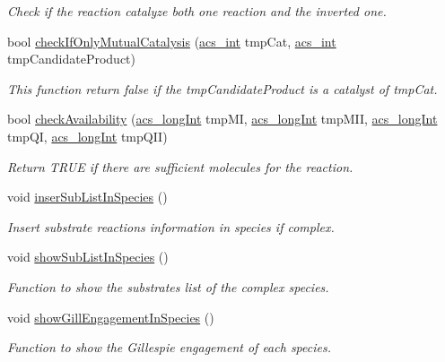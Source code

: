 \begin{DoxyCompactItemize}
\begin{DoxyCompactList}\small\item\em Check if the reaction catalyze both one reaction and the inverted one. \end{DoxyCompactList}\item 
bool \hyperlink{a00011_abdafaeba15b5d32fd35569869c6244d5}{check\-If\-Only\-Mutual\-Catalysis} (\hyperlink{a00024_a8d277355641a098190360234e2ebde35}{acs\-\_\-int} tmp\-Cat, \hyperlink{a00024_a8d277355641a098190360234e2ebde35}{acs\-\_\-int} tmp\-Candidate\-Product)
\begin{DoxyCompactList}\small\item\em This function return false if the tmp\-Candidate\-Product is a catalyst of tmp\-Cat. \end{DoxyCompactList}\item 
bool \hyperlink{a00011_ad3ebcd7ab1c9ba1a0f65b264b97adf33}{check\-Availability} (\hyperlink{a00024_a19319d75f02db4308bc5c0026d98cd85}{acs\-\_\-long\-Int} tmp\-M\-I, \hyperlink{a00024_a19319d75f02db4308bc5c0026d98cd85}{acs\-\_\-long\-Int} tmp\-M\-I\-I, \hyperlink{a00024_a19319d75f02db4308bc5c0026d98cd85}{acs\-\_\-long\-Int} tmp\-Q\-I, \hyperlink{a00024_a19319d75f02db4308bc5c0026d98cd85}{acs\-\_\-long\-Int} tmp\-Q\-I\-I)
\begin{DoxyCompactList}\small\item\em Return T\-R\-U\-E if there are sufficient molecules for the reaction. \end{DoxyCompactList}\item 
void \hyperlink{a00011_af293fafca4582120d88f888d70d8623a}{inser\-Sub\-List\-In\-Species} ()
\begin{DoxyCompactList}\small\item\em Insert substrate reactions information in species if complex. \end{DoxyCompactList}\item 
void \hyperlink{a00011_a5cb194f927ddc7a804a942ca71f062af}{show\-Sub\-List\-In\-Species} ()
\begin{DoxyCompactList}\small\item\em Function to show the substrates list of the complex species. \end{DoxyCompactList}\item 
void \hyperlink{a00011_aef1d3687767151218f3b7379dc230430}{show\-Gill\-Engagement\-In\-Species} ()
\begin{DoxyCompactList}\small\item\em Function to show the Gillespie engagement of each species. \end{DoxyCompactList}\item 

\end{DoxyCompactItemize}
